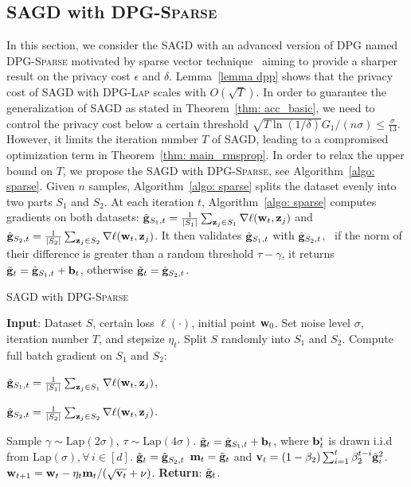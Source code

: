 \documentclass[11pt]{article}
\begin{document}
\subsection{\textsc{SAGD} with \textsc{DPG-Sparse}} \label{subsec: SAGD-sparse}
\vspace{-0.05in}
In this section, we consider the \textsc{SAGD} with an advanced version of DPG named \textsc{DPG-Sparse} motivated by sparse vector technique~\citep{dwro2014} aiming to provide a sharper result on the privacy cost $\epsilon$ and $\delta$.
Lemma~\ref{lemma dpp} shows that the privacy cost of \textsc{SAGD} with \textsc{DPG-Lap} scales with $O(\sqrt{T})$. In order to guarantee the generalization of \textsc{SAGD} as stated in Theorem~\ref{thm: acc_basic}, we need to control the privacy cost below a certain threshold \ie $\sqrt{T \ln(1/\delta)} G_1/(n\sigma) \leq \frac{\sigma}{13}$. However, it limits the iteration number $T$ of \textsc{SAGD}, leading to a compromised optimization term in Theorem~\ref{thm: main_rmsprop}.  
In order to relax the upper bound on $T$, we propose the \textsc{SAGD} with \textsc{DPG-Sparse}, see Algorithm~\ref{algo: sparse}.
Given $n$ samples, Algorithm~\ref{algo: sparse} splits the dataset evenly into two parts $S_1$ and $S_2$. 
At each iteration $t$, Algorithm~\ref{algo: sparse} computes gradients on both datasets:
$\hat {\mathbf{g}}_{S_1,t} = \frac{1}{|S_1|} \sum_{\mathbf{z}_j \in S_1}\nabla \ell(\mathbf{w}_t, \mathbf{z}_j)$ and $\hat {\mathbf{g}}_{S_2,t} = \frac{1}{|S_2|} \sum_{\mathbf{z}_j \in S_2}\nabla \ell(\mathbf{w}_t, \mathbf{z}_j)$.
It then validates $\hat {\mathbf{g}}_{S_1,t} $ with $\hat {\mathbf{g}}_{S_2,t}$, \ie\ if the norm of their difference is greater than a random threshold $\tau-\gamma$, it returns $\tilde {\mathbf{g}}_t = \hat {\mathbf{g}}_{S_1,t} + \mathbf{b}_t$, otherwise $\tilde {\mathbf{g}}_t = \hat {\mathbf{g}}_{S_2,t}$.
\begin{algorithm}[H]
\caption{\textsc{SAGD} with \textsc{DPG-Sparse}}
\begin{algorithmic}[1]
\label{algo: sparse}
\STATE \textbf{Input}: Dataset $S$,  certain loss $\ell(\cdot)$, initial point $\mathbf{w}_0$.
\STATE Set  noise level $\sigma$, iteration number $T$,  and stepsize $\eta_t$.
\STATE Split $S$ randomly into $S_1$ and $S_2$. 
\STATE   Compute full batch gradient on $S_1$ and $S_2$:\\
\centerline{$\hat {\mathbf{g}}_{S_1,t} = \frac{1}{|S_1|} \sum_{\mathbf{z}_j \in S_1}\nabla \ell(\mathbf{w}_t, \mathbf{z}_j)$,}
\centerline{$\hat {\mathbf{g}}_{S_2,t} = \frac{1}{|S_2|} \sum_{\mathbf{z}_j \in S_2}\nabla \ell(\mathbf{w}_t, \mathbf{z}_j)$.}
\STATE Sample $\gamma \sim \text{Lap}(2\sigma)$, $\tau \sim \text{Lap}(4\sigma)$.
\STATE  $\tilde {\mathbf{g}}_t = \hat {\mathbf{g}}_{S_1,t} + \mathbf{b}_t$, where $\mathbf{b}_t^i$ is drawn i.i.d from Lap$(\sigma), \forall\, i \in [d]$.
\ELSE \STATE $\tilde {\mathbf{g}}_t = \hat {\mathbf{g}}_{S_2,t}$
\ENDIF
\STATE 
$\mathbf{m}_t = \tilde {\mathbf{g}}_t$ and $\mathbf{v}_t = \left(1-\beta_{2}\right) \sum_{i=1}^{t} \beta_{2}^{t-i} \tilde {\mathbf{g}}_{i}^{2}$.
\STATE $\mathbf{w}_{t+1}=\mathbf{w}_{t}-\eta_t \mathbf{m}_t /(\sqrt{\mathbf{v}_t}+\nu)$.
\ENDFOR 
\STATE \textbf{Return}: $\tilde {\mathbf{g}}_t$.
\end{algorithmic}
\end{algorithm}
\end{document}

